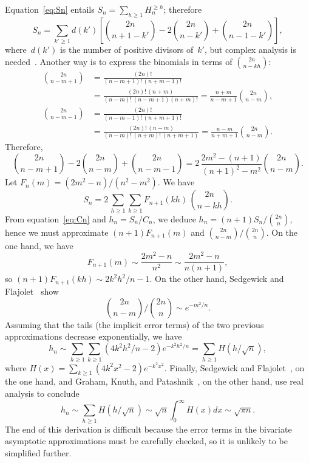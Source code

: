 \documentclass[11pt]{article}
\newcommand{\B}[2]{H_{#1}^{\geqslant #2}}
\begin{document}
Equation~\eqref{eq:Sn}
entails \(S_{n} = \sum_{h \geqslant 1}\B{n}{h}\); therefore
\begin{equation*}
S_{n} = \sum_{k' \geqslant 1}d(k') %
        \left[\binom{2n}{n+1-k'} - 2\binom{2n}{n-k'}
        + \binom{2n}{n-1-k'}\right],
\end{equation*}
where~\(d(k')\) is the number of positive divisors of~\(k'\), but
complex analysis is
needed~\cite{KnuthdeBruijnRice:1972,FlajoletGourdonDumas:1995}. Another
way is to express the binomials in terms of \(\binom{2n}{n-kh}\):
\begin{align*}
\binom{2n}{n-m+1} &= \frac{(2n)!}{(n-m+1)!\,(n+m-1)!}\\
                  &= \frac{(2n)!\,(n+m)}{(n-m)!\,(n-m+1)(n+m)!} 
                   = \frac{n+m}{n-m+1}\binom{2n}{n-m},\\
\binom{2n}{n-m-1} &= \frac{(2n)!}{(n-m-1)!\,(n+m+1)!}\\
                  &= \frac{(2n)!\,(n-m)}{(n-m)!\,(n+m)!\,(n+m+1)}
                   = \frac{n-m}{n+m+1}\binom{2n}{n-m}.
\end{align*}
Therefore,
\begin{equation*}
\binom{2n}{n-m+1} - 2\binom{2n}{n-m} + \binom{2n}{n-m-1}
= 2 \, \frac{2m^2-(n+1)}{(n+1)^2-m^2}\binom{2n}{n-m}.
\end{equation*}
Let \(F_n(m) = (2m^2-n)/(n^2-m^2)\). We have
\begin{equation*}
S_{n} = 2 \, \sum_{h \geqslant 1}\sum_{k \geqslant 1} F_{n+1}(kh)
\, \binom{2n}{n-kh}.
\end{equation*}
From equation~\eqref{eq:Cn} and \(h_n = S_n/C_n\), we deduce \(h_{n} =
(n+1)S_{n}/{\binom{2n}{n}}\), hence we must approximate
\((n+1)F_{n+1}(m)\) and \(\binom{2n}{n-m}/\binom{2n}{n}\). On the
one hand, we have
\begin{equation*}
F_{n+1}(m) \sim \frac{2m^2-n}{n^2} \sim \frac{2m^2-n}{n(n+1)},
\end{equation*}
so \((n+1)F_{n+1}(kh) \sim 2k^2h^2\!/n-1\). On the other hand,
Sedgewick and Flajolet~\cite[4.6, 4.8]{SedgewickFlajolet:1996} show
\begin{equation*}
\binom{2n}{n-m}\bigg/{\binom{2n}{n}} \sim e^{-m^2\!/n}.
\end{equation*}
Assuming that the tails (the implicit error terms) of the two previous
approximations decrease exponentially, we have
\begin{equation*}
h_{n} \sim \sum_{h \geqslant 1}\sum_{k \geqslant 1}
(4k^2h^2\!/n - 2)e^{-k^2h^2\!/n}
= \sum_{h \geqslant 1}H(h/\!\sqrt{n}), 
\end{equation*}
where \(H(x) = \sum_{k \geqslant 1}(4k^2x^2-2)e^{-k^2x^2}\). Finally,
Sedgewick and Flajolet~\cite[\S 5.9]{SedgewickFlajolet:1996}, on the one
hand, and Graham, Knuth, and
Patashnik~\cite[\S 9.6]{GrahamKnuthPatashnik:1994}, on the other hand,
use real analysis to conclude
\begin{equation*}
h_n \sim \sum_{h \geqslant 1}H(h/\!\sqrt{n})
    \sim \sqrt{n} \int_0^{\infty}H(x) dx \sim \sqrt{\pi n}.
\end{equation*}
The end of this derivation is difficult because the error terms in the
bivariate asymptotic approximations must be carefully checked, so it
is unlikely to be simplified further. 
\end{document}
